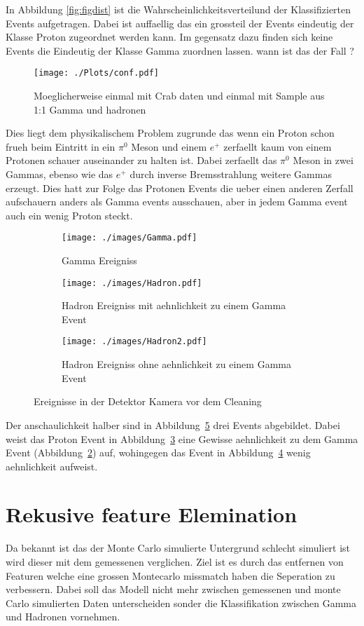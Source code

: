 In Abbildung \ref{fig:figdist} ist die Wahrscheinlichkeitsverteilund der Klassifizierten Events aufgetragen. 
Dabei ist auffaellig das ein grossteil der Events eindeutig der Klasse Proton zugeordnet werden kann. 
Im gegensatz dazu finden sich keine Events die Eindeutig der Klasse Gamma zuordnen lassen.
wann ist das der Fall ?
\begin{figure}[H]
  \centering
  \texttt{[image: ./Plots/conf.pdf]}
  \caption{Moeglicherweise einmal mit Crab daten und einmal mit Sample aus 1:1 Gamma und hadronen}
  \label{fig:confdist}
\end{figure}
Dies liegt dem physikalischem Problem zugrunde das wenn ein Proton schon frueh beim Eintritt in ein $\pi^{0}$ Meson und einem $e^{+}$ zerfaellt kaum von einem Protonen schauer auseinander zu halten ist.
Dabei zerfaellt das $\pi^{0}$ Meson in zwei Gammas, ebenso wie das $e^{+}$ durch inverse Bremsstrahlung weitere Gammas erzeugt. 
Dies hatt zur Folge das Protonen Events die ueber einen anderen Zerfall aufschauern anders als Gamma events ausschauen, aber in jedem Gamma event auch ein wenig Proton steckt.
\begin{figure}[H]
  \centering
\begin{subfigure}[t]{0.3\textwidth}
  \centering
  \texttt{[image: ./images/Gamma.pdf]}
  \caption{Gamma Ereigniss}
  \label{fig:gammaevent}
\end{subfigure}
\begin{subfigure}[t]{0.3\textwidth}
  \centering
  \texttt{[image: ./images/Hadron.pdf]}
  \caption{Hadron Ereigniss mit aehnlichkeit zu einem Gamma Event}
  \label{fig:hadevent}
\end{subfigure}
\begin{subfigure}[t]{0.3\textwidth}
  \centering
  \texttt{[image: ./images/Hadron2.pdf]}
  \caption{Hadron Ereigniss ohne aehnlichkeit zu einem Gamma Event}
  \label{fig:had2event}
\end{subfigure}
\caption{Ereignisse in der Detektor Kamera vor dem Cleaning \cite{??}}
\label{fig:picevents}
\end{figure}
Der anschaulichkeit halber sind in Abbildung~\ref{fig:picevents} drei Events abgebildet.
Dabei weist das Proton Event in Abbildung~\ref{fig:hadevent} eine Gewisse aehnlichkeit zu dem Gamma Event (Abbildung~\ref{fig:gammaevent}) auf, wohingegen das Event in Abbildung~\ref{fig:had2event} wenig aehnlichkeit aufweist.
\section{Rekusive feature Elemination}
Da bekannt ist das der Monte Carlo simulierte Untergrund schlecht simuliert ist wird dieser mit dem gemessenen verglichen. 
Ziel ist es durch das entfernen von Featuren welche eine grossen Montecarlo missmatch haben die Seperation zu verbessern. 
Dabei soll das Modell nicht mehr zwischen gemessenen und monte Carlo simulierten Daten unterscheiden sonder die Klassifikation zwischen Gamma und Hadronen vornehmen.

